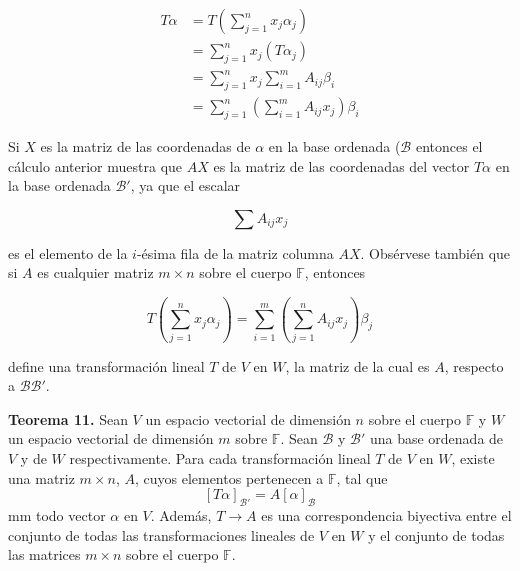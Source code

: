 \newpage

\begin{align*}
    T\alpha &= T\left (\sum_{j=1}^{n} x_{j}\alpha_{j}\right )\\
            &= \sum_{j=1}^{n} x_{j}(T\alpha_{j})\\
            &= \sum_{j=1}^{n} x_{j} \sum_{i=1}^{m} A_{ij}\beta_{i}\\
            &= \sum_{j=1}^{n} \left ( \sum_{i=1}^{m} A_{ij}x_{j}\right )\beta_{i}
\end{align*}

Si $X$ es la matriz de las coordenadas de $\alpha$ en la
base ordenada ($\mathcal{B}$ entonces el cálculo anterior
muestra que $AX$ es la matriz de las coordenadas del vector $T\alpha$
en la base ordenada $\mathcal{B}'$, ya que el escalar

$$\sum A_{ij}x_{j}$$

es el elemento de la $i$-ésima fila de la matriz columna $AX$.
Obsérvese también que si $A$ es cualquier matriz $m \times n$
sobre el cuerpo $\mathbb{F}$, entonces

\begin{equation}
    T\left (\sum_{j=1}^{n} x_{j}\alpha_{j}\right )
    =
    \sum_{i=1}^{m} \left (\sum_{j=1}^{n} A_{ij}x_{j} \right )\beta_{j}
\end{equation}

define una transformación lineal $T$ de $V$ en $W$, la matriz
de la cual es $A$, respecto a $\mathcal{B}\mathcal{B}'$.

\textbf{Teorema 11.} Sean $V$ un espacio vectorial de dimensión $n$
sobre el cuerpo  $\mathbb{F}$ y $W$ un espacio vectorial de dimensión
$m$ sobre $\mathbb{F}$. Sean $\mathcal{B}$ y $\mathcal{B}'$ una
base ordenada de $V$ y de $W$ respectivamente. Para cada transformación
lineal $T$ de $V$ en $W$, existe una matriz $m \times n$, $A$,
cuyos elementos pertenecen a $\mathbb{F}$, tal que
$$[T\alpha]_{\mathcal{B}'} = A[\alpha]_{\mathcal{B}}$$
mm todo vector $\alpha$ en $V$. Además, $T \to A$ es una correspondencia
biyectiva entre el conjunto de todas las transformaciones lineales
de $V$ en $W$ y el conjunto de todas las matrices $m \times n$ sobre el
cuerpo $\mathbb{F}$.